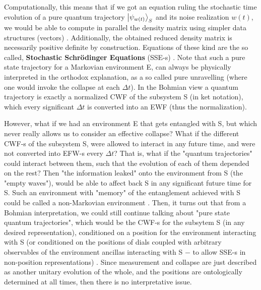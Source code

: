 \documentclass[11pt, a4paper]{article} %
\begin{document}
Computationally, this means that if we got an equation ruling the stochastic time evolution of a pure quantum trajectory $\ket{\psi_{w(t)}}_S$ and its noise realization $w(t)$, we would be able to compute in parallel the density matrix using simpler data structures (vectors) \cite{MarkovianityDefs, QuantumTrajs}. Additionally, the obtained reduced density matrix is necessarily positive definite by construction. Equations of these kind are the so called, {\bf Stochastic Schrödinger Equations} (SSE-s) \cite{Generalized, continousMeas}. Note that such a pure state trajectory for a Markovian environment E, can always be physically interpreted in the orthodox explanation, as a so called pure unravelling \cite{MarkovianityDefs} (where one would invoke the collapse at each $\Delta t$). In the Bohmian view a quantum trajectory is exactly a normalized CWF of the subsystem S (in ket notation), which every significant $\Delta t$ is converted into an EWF (thus the normalization).\vspace{-0.05cm}
 

However, what if we had an environment E that gets entangled with S, but which never really allows us to consider an effective collapse? What if the different CWF-s of the subsystem S, were allowed to interact in any future time, and were not converted into EFW-s every $\Delta t$? That is, what if the "quantum trajectories" could interact between them, such that the evolution of each of them depended on the rest? Then "the information leaked" onto the environment from S (the "empty waves"), would be able to affect back S in any significant future time for S. Such an environment with "memory" of the entanglement achieved with S could be called a non-Markovian environment \cite{MarkovianityDefs}. Then, it turns out that from a Bohmian interpretation, we could still continue talking about "pure state quantum trajectories", which would be the CWF-s for the subsytem S (in any desired representation), conditioned on a position for the environment interacting with S (or conditioned on the positions of dials coupled with arbitrary observables of the environment ancillas interacting with S $-$ to allow SSE-s in non-position representations) \cite{NMisModal, interpretSSE}. Since measurement and collapse are just described as another unitary evolution of the whole, and the positions are ontologically determined at all times, then there is no interpretative issue.\vspace{-0.05cm}
\end{document}
